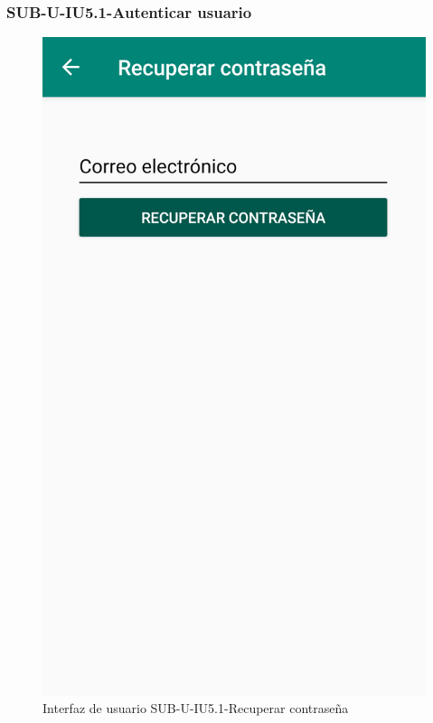 \subsubsection{SUB-U-IU5.1-Autenticar usuario}\label{SUB-U-IU5.1}
\begin{figure}[H]
	\centering
	\includegraphics[scale=.28]{Capitulo4/software/submodulos/usuarios/images/sub-u-iu5_1}
	\caption{Interfaz de usuario SUB-U-IU5.1-Recuperar contraseña}
	\label{fig:sub-u-iu5.1}
\end{figure}